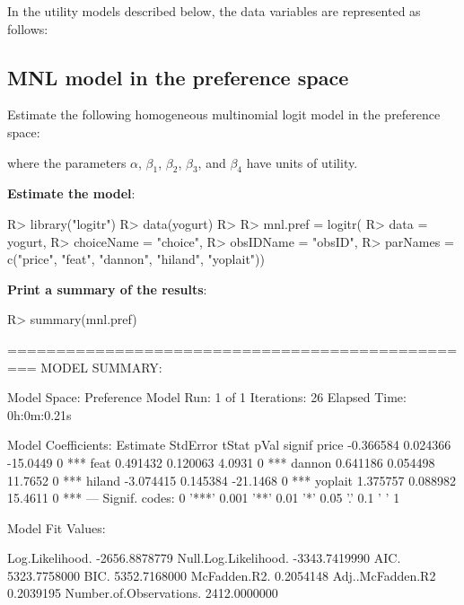 \documentclass[article]{jss}
\begin{document}
In the utility models described below, the data variables are
represented as follows:



\hypertarget{mnl-model-in-the-preference-space}{%
\subsection{MNL model in the preference
space}\label{mnl-model-in-the-preference-space}}

Estimate the following homogeneous multinomial logit model in the
preference space:



where the parameters \(\alpha\), \(\beta_1\), \(\beta_2\), \(\beta_3\),
and \(\beta_4\) have units of utility.

\textbf{Estimate the model}:

\begin{CodeChunk}

\begin{CodeInput}
R> library("logitr")
R> data(yogurt)
R> 
R> mnl.pref = logitr(
R>     data       = yogurt,
R>     choiceName = "choice",
R>     obsIDName  = "obsID",
R>     parNames   = c("price", "feat", "dannon", "hiland", "yoplait"))
\end{CodeInput}
\end{CodeChunk}

\textbf{Print a summary of the results}:

\begin{CodeChunk}

\begin{CodeInput}
R> summary(mnl.pref)
\end{CodeInput}

\begin{CodeOutput}
=================================================
MODEL SUMMARY: 
                         
Model Space:   Preference
Model Run:         1 of 1
Iterations:            26
Elapsed Time: 0h:0m:0.21s

Model Coefficients: 
         Estimate StdError    tStat pVal signif
price   -0.366584 0.024366 -15.0449    0    ***
feat     0.491432 0.120063   4.0931    0    ***
dannon   0.641186 0.054498  11.7652    0    ***
hiland  -3.074415 0.145384 -21.1468    0    ***
yoplait  1.375757 0.088982  15.4611    0    ***
---
Signif. codes:  0 '***' 0.001 '**' 0.01 '*' 0.05 '.' 0.1 ' ' 1

Model Fit Values: 
                                     
Log.Likelihood.         -2656.8878779
Null.Log.Likelihood.    -3343.7419990
AIC.                     5323.7758000
BIC.                     5352.7168000
McFadden.R2.                0.2054148
Adj..McFadden.R2            0.2039195
Number.of.Observations.  2412.0000000
\end{CodeOutput}
\end{CodeChunk}
\end{document}

